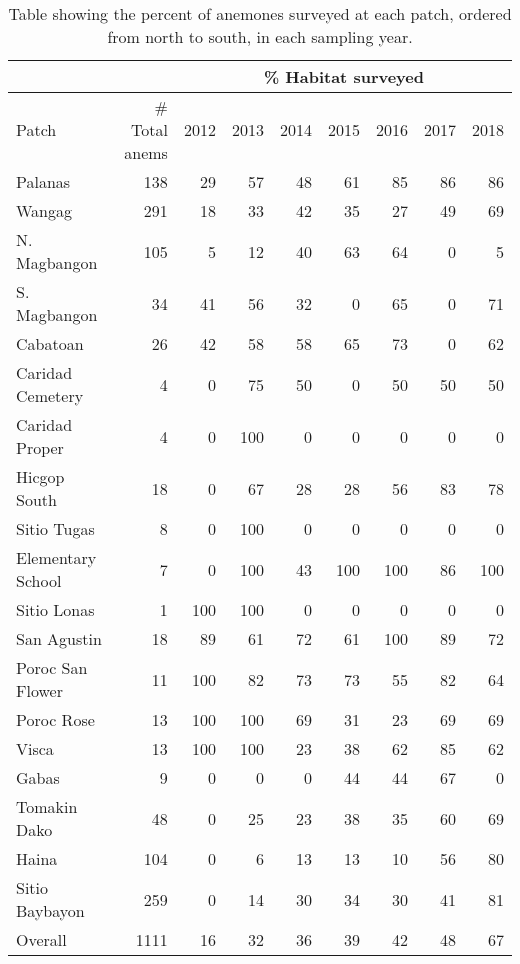 \documentclass[12pt, oneside]{article}   	%
\begin{document}
\begin{table}[!htbp]
\caption{Table showing the percent of anemones surveyed at each patch, ordered from north to south, in each sampling year.} \label{APP_TAB_PercHabSampled}
\begin{centering}
\begin{tabular}{|l|r|r|r|r|r|r|r|r|}
\hline 
\multicolumn{2}{|c|}{} & \multicolumn{7}{|c|}{\% Habitat surveyed} \\ \hline
Patch & \# Total anems & 2012 & 2013 & 2014 & 2015 & 2016 & 2017 & 2018 \\ \hline
Palanas & 138 & 29 & 57 & 48 & 61 & 85 & 86 & 86 \\ \hline  %
Wangag & 291 & 18 & 33 & 42 & 35 & 27 & 49 & 69 \\ \hline  %
N. Magbangon & 105 & 5 & 12 & 40 & 63 & 64 & 0 & 5 \\ \hline
S. Magbangon & 34 & 41 & 56 & 32 & 0 & 65 & 0 & 71 \\ \hline
Cabatoan & 26 & 42 & 58 & 58 & 65 & 73 & 0 & 62 \\ \hline
Caridad Cemetery & 4 & 0 & 75 & 50 & 0 & 50 & 50 & 50 \\ \hline
Caridad Proper & 4 & 0 & 100 & 0 & 0 & 0 & 0 & 0 \\ \hline  %
Hicgop South & 18 & 0 & 67 & 28 & 28 & 56 & 83 & 78 \\ \hline
Sitio Tugas & 8 & 0 & 100 & 0 & 0 & 0 & 0 & 0 \\ \hline  %
Elementary School & 7 & 0 & 100 & 43 & 100 & 100 & 86 & 100 \\ \hline  %
Sitio Lonas & 1 & 100 & 100 & 0 & 0 & 0 & 0 & 0 \\ \hline  %
San Agustin & 18 & 89 & 61 & 72 & 61 & 100 & 89 & 72 \\ \hline  %
Poroc San Flower & 11 & 100 & 82 & 73 & 73 & 55 & 82 & 64 \\ \hline
Poroc Rose & 13 & 100 & 100 & 69 & 31 & 23 & 69 & 69 \\ \hline
Visca & 13 & 100 & 100 & 23 & 38 & 62 & 85 & 62 \\ \hline
Gabas & 9 & 0 & 0 & 0 & 44 & 44 & 67 & 0 \\ \hline
Tomakin Dako & 48 & 0 & 25 & 23 & 38 & 35 & 60 & 69 \\ \hline  %
Haina & 104 & 0 & 6 & 13 & 13 & 10 & 56 & 80 \\ \hline
Sitio Baybayon & 259 & 0 & 14 & 30 & 34 & 30 & 41 & 81 \\ \hline  %
Overall & 1111 & 16 & 32 & 36 & 39 & 42 & 48 & 67 \\ \hline
\end{tabular}
\end{centering}
\end{table}
\end{document}
